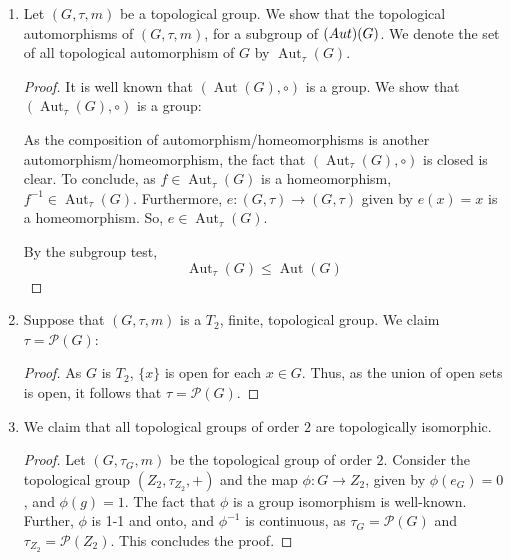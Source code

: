 \documentclass{book}
\DeclareMathOperator*{\Aut}{\text{Aut}}
\begin{document}
\begin{enumerate}[(1)]
    \item Let $(G, \tau, m)$ be a topological group. We show that the topological automorphisms of $(G, \tau, m)$, for a subgroup of $\text(Aut)(G)$. We denote the set of all topological automorphism of $G$ by $\Aut_\tau (G)$. 
        \begin{proof} It is well known that $(\Aut (G), \circ)$ is a group. We show that $(\Aut_\tau (G), \circ)$ is a group: 
            \par As the composition of automorphism/homeomorphisms is another automorphism/homeomorphism, the fact that $(\Aut_\tau (G), \circ )$ is closed is clear. To conclude, as $f \in \Aut_\tau(G)$ is a homeomorphism, $f^{-1} \in \Aut_\tau(G)$. Furthermore, $e: (G, \tau) \rightarrow (G, \tau)$ given by $e(x) = x$ is a homeomorphism. So, $e \in \Aut_\tau(G)$. 
            \par By the subgroup test, 
            $$\Aut_\tau(G) \leq \Aut(G)$$
        \end{proof}

    \item Suppose that $(G, \tau, m)$ is a $T_2$, finite, topological group. We claim $\tau = \mathcal{P}(G)$: 
        \begin{proof} As $G$ is $T_2$, $\{x\}$ is open for each $x \in G$. Thus, as the union of open sets is open, it follows that $\tau = \mathcal{P}(G)$. 
        \end{proof}

    \item We claim that all topological groups of order $2$ are topologically isomorphic. 
        \begin{proof} Let $(G, \tau_G, m)$ be the topological group of order $2$. Consider the topological group $(Z_2, \tau_{Z_2}, +)$ and the map $\phi: G \rightarrow Z_2$, given by $\phi(e_G) = 0$, and $\phi(g) = 1$. The fact that $\phi$ is a group isomorphism is well-known. Further, $\phi$ is 1-1 and onto, and $\phi^{-1}$ is continuous, as $\tau_G = \mathcal{P}(G)$ and $\tau_{Z_2} = \mathcal{P}(Z_2)$. This concludes the proof. 
        \end{proof}
\end{enumerate}
\end{document}

